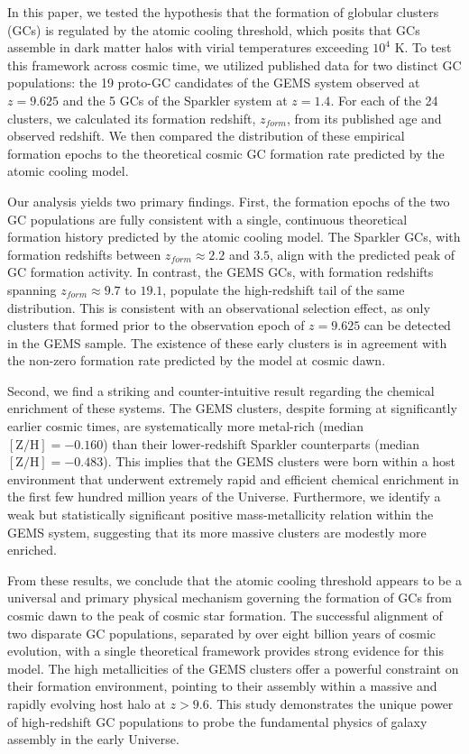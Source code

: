 \documentclass[]{article}
\begin{document}
In this paper, we tested the hypothesis that the formation of globular clusters (GCs) is regulated by the atomic cooling threshold, which posits that GCs assemble in dark matter halos with virial temperatures exceeding $10^4$ K. To test this framework across cosmic time, we utilized published data for two distinct GC populations: the 19 proto-GC candidates of the GEMS system observed at $z=9.625$ and the 5 GCs of the Sparkler system at $z=1.4$. For each of the 24 clusters, we calculated its formation redshift, $z_{form}$, from its published age and observed redshift. We then compared the distribution of these empirical formation epochs to the theoretical cosmic GC formation rate predicted by the atomic cooling model.

Our analysis yields two primary findings. First, the formation epochs of the two GC populations are fully consistent with a single, continuous theoretical formation history predicted by the atomic cooling model. The Sparkler GCs, with formation redshifts between $z_{form} \approx 2.2$ and $3.5$, align with the predicted peak of GC formation activity. In contrast, the GEMS GCs, with formation redshifts spanning $z_{form} \approx 9.7$ to $19.1$, populate the high-redshift tail of the same distribution. This is consistent with an observational selection effect, as only clusters that formed prior to the observation epoch of $z=9.625$ can be detected in the GEMS sample. The existence of these early clusters is in agreement with the non-zero formation rate predicted by the model at cosmic dawn.

Second, we find a striking and counter-intuitive result regarding the chemical enrichment of these systems. The GEMS clusters, despite forming at significantly earlier cosmic times, are systematically more metal-rich (median $[\mathrm{Z/H}] = -0.160$) than their lower-redshift Sparkler counterparts (median $[\mathrm{Z/H}] = -0.483$). This implies that the GEMS clusters were born within a host environment that underwent extremely rapid and efficient chemical enrichment in the first few hundred million years of the Universe. Furthermore, we identify a weak but statistically significant positive mass-metallicity relation within the GEMS system, suggesting that its more massive clusters are modestly more enriched.

From these results, we conclude that the atomic cooling threshold appears to be a universal and primary physical mechanism governing the formation of GCs from cosmic dawn to the peak of cosmic star formation. The successful alignment of two disparate GC populations, separated by over eight billion years of cosmic evolution, with a single theoretical framework provides strong evidence for this model. The high metallicities of the GEMS clusters offer a powerful constraint on their formation environment, pointing to their assembly within a massive and rapidly evolving host halo at $z>9.6$. This study demonstrates the unique power of high-redshift GC populations to probe the fundamental physics of galaxy assembly in the early Universe.


{}

\end{document}
